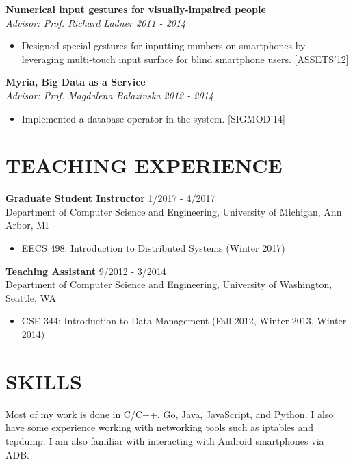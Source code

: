 \documentclass[zhemargin]{res}
\begin{document}
\begin{resume}
	\textbf{Numerical input gestures for visually-impaired people}\\
    \textit{Advisor: Prof. Richard Ladner \hfill 2011 - 2014}
	\begin{itemize}
    \item Designed special gestures for inputting numbers on smartphones
      by leveraging multi-touch input surface for blind smartphone users. [ASSETS'12]
	\end{itemize}

	\textbf{Myria, Big Data as a Service}\\
    \textit{Advisor: Prof. Magdalena Balazinska \hfill 2012 - 2014}
	\begin{itemize}
    \item Implemented a database operator in the system. [SIGMOD'14]
	\end{itemize}


\section{\small TEACHING EXPERIENCE}
	\textbf{Graduate Student Instructor} \hfill 1/2017 - 4/2017 \\
	Department of Computer Science and Engineering, University of Michigan, Ann Arbor, MI
	\begin{itemize}
      \item EECS 498: Introduction to Distributed Systems (Winter 2017)
	\end{itemize}
	\textbf{Teaching Assistant} \hfill 9/2012 - 3/2014 \\
	Department of Computer Science and Engineering, University of Washington, Seattle, WA
	\begin{itemize}
      \item CSE 344: Introduction to Data Management (Fall 2012, Winter 2013, Winter 2014)
	\end{itemize}

\section{\small SKILLS}
  Most of my work is done in C/C++, Go, Java, JavaScript, and Python. I also have some
  experience working with networking tools such as iptables and tcpdump. I am
  also familiar with interacting with Android smartphones via ADB.

\end{resume}
\end{document}
